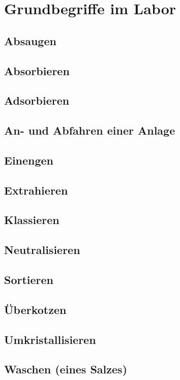 \section{Grundbegriffe im Labor}
\subsection{Absaugen}
\subsection{Absorbieren}
\subsection{Adsorbieren}
\subsection{An- und Abfahren einer Anlage}
\subsection{Einengen}
\subsection{Extrahieren}
\subsection{Klassieren}
\subsection{Neutralisieren}
\subsection{Sortieren}
\subsection{Überkotzen}
\subsection{Umkristallisieren}
\subsection{Waschen (eines Salzes)}






